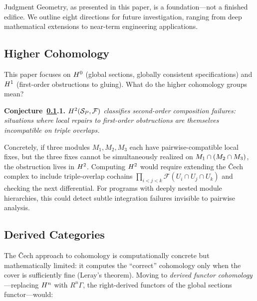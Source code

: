 Judgment Geometry, as presented in this paper, is a foundation---not
a finished edifice.  We outline eight directions for future
investigation, ranging from deep mathematical extensions to
near-term engineering applications.

\subsection{Higher Cohomology}\label{sec:future-higher}

This paper focuses on $H^{0}$ (global sections, \ie globally
consistent specifications) and $H^{1}$ (first-order obstructions
to gluing).  What do the higher cohomology groups mean?

\medskip\noindent
\textbf{Conjecture~\ref*{sec:future-higher}.1.}
\emph{$H^{2}(\mathcal{S}_P, \mathcal{F})$ classifies second-order
composition failures: situations where local repairs to first-order
obstructions are themselves incompatible on triple overlaps.}
\medskip

Concretely, if three modules $M_1, M_2, M_3$ each have pairwise-compatible
local fixes, but the three fixes cannot be simultaneously realized on
$M_1 \cap (M_2 \cap M_3)$, the obstruction lives in
$H^{2}$.  Computing $H^{2}$ would require extending the
\v{C}ech complex to include triple-overlap cochains
$\prod_{i<j<k} \mathcal{F}(U_i \cap U_j \cap U_k)$ and checking the
next differential.  For programs with deeply nested module hierarchies,
this could detect subtle integration failures invisible to
pairwise analysis.

\subsection{Derived Categories}\label{sec:future-derived}

The \v{C}ech approach to cohomology is computationally concrete but
mathematically limited: it computes the ``correct'' cohomology only
when the cover is sufficiently fine (Leray's theorem).  Moving to
\emph{derived functor cohomology}---\ie replacing $H^{n}$ with
$R^n\Gamma$, the right-derived functors of the global sections
functor---would:

